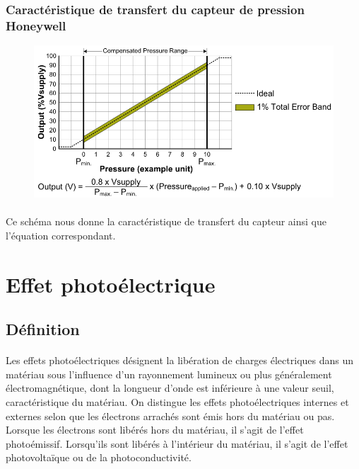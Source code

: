 \documentclass{article}
\begin{document}
            \subsubsection{Caractéristique de transfert du capteur de pression Honeywell}
            \begin{figure}[H]
                \centering
                \includegraphics[width=0.7\linewidth]{./images/piezo-schema-caract-transfert.png}
            \end{figure}

            \paragraph{}
            Ce schéma nous donne la caractéristique de transfert du capteur ainsi que l'équation correspondant.

    
    \newpage
    \section{Effet photoélectrique}

    \subsection{Définition}
    \paragraph{}
    Les effets photoélectriques désignent la libération de charges électriques dans un matériau sous l'influence d'un rayonnement lumineux ou plus généralement électromagnétique, dont la longueur d'onde est inférieure à une valeur seuil, caractéristique du matériau. On distingue les effets photoélectriques internes et externes selon que les électrons arrachés sont émis hors du matériau ou pas. Lorsque les électrons sont libérés hors du matériau, il s'agit de l'effet photoémissif. Lorsqu'ils sont libérés à l'intérieur du matériau, il s'agit de l'effet photovoltaïque ou de la photoconductivité. 
\end{document}
